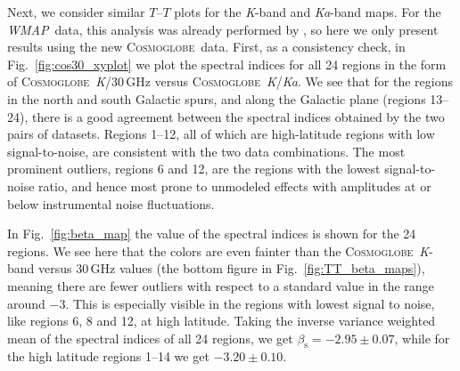 \documentclass[twocolumn]{../../common/aa}
\def\wmap{\emph{WMAP}}
\newcommand{\cosmoglobe}{\textsc{Cosmoglobe}}
\newcommand{\K}[0]{\textit K}
\newcommand{\Ka}[0]{\textit{Ka}}
\begin{document}
Next, we consider similar $T$--$T$ plots for the \K-band and \Ka-band maps. For the \wmap\ data, this analysis was already performed by \citet{fuskeland2014}, so here we only present results using the new \cosmoglobe\ data. First, as a consistency check, in Fig.~\ref{fig:cos30_xyplot} we plot the spectral indices for all 24 regions in the form of \cosmoglobe\ \K/30\,GHz versus \cosmoglobe\ \K/\Ka. We see that for the regions in the north and south Galactic spurs, and along the Galactic plane (regions 13--24), there is a good agreement between the spectral indices obtained by the two pairs of datasets. Regions 1--12, all of which are high-latitude regions with low signal-to-noise, are consistent with the two data combinations. The most prominent outliers, regions 6 and 12, are the regions with the lowest signal-to-noise ratio, and hence most prone to unmodeled effects with amplitudes at or below instrumental noise fluctuations.

In Fig.~\ref{fig:beta_map} the value of the spectral indices is shown for the 24 regions. We see here that the colors are even fainter than the \cosmoglobe\ \K-band versus 30\,GHz values (the bottom figure in Fig.~\ref{fig:TT_beta_maps}), meaning there are fewer outliers with respect to a standard value in the range around $-3$. This is especially visible in the regions with lowest signal to noise, like regions 6, 8 and 12, at high latitude. Taking the inverse variance weighted mean of the spectral indices of all 24 regions, we get $\beta_{\mathrm{s}}=-2.95\pm0.07$, while for the high latitude regions 1--14 we get $-3.20\pm0.10$.




\end{document}
